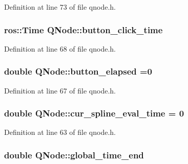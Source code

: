 Definition at line 73 of file qnode.\+h.

\subsubsection[{\texorpdfstring{button\+\_\+click\+\_\+time}{button_click_time}}]{\setlength{\rightskip}{0pt plus 5cm}ros\+::\+Time Q\+Node\+::button\+\_\+click\+\_\+time}\hypertarget{class_q_node_a96e6599c14732ded065ae6a5b004f872}{}\label{class_q_node_a96e6599c14732ded065ae6a5b004f872}


Definition at line 68 of file qnode.\+h.

\subsubsection[{\texorpdfstring{button\+\_\+elapsed}{button_elapsed}}]{\setlength{\rightskip}{0pt plus 5cm}double Q\+Node\+::button\+\_\+elapsed =0}\hypertarget{class_q_node_a2893bbeba854c1cc89d2271804325b7b}{}\label{class_q_node_a2893bbeba854c1cc89d2271804325b7b}


Definition at line 67 of file qnode.\+h.

\subsubsection[{\texorpdfstring{cur\+\_\+spline\+\_\+eval\+\_\+time}{cur_spline_eval_time}}]{\setlength{\rightskip}{0pt plus 5cm}double Q\+Node\+::cur\+\_\+spline\+\_\+eval\+\_\+time = 0}\hypertarget{class_q_node_a45fa5f948c36d96f286d65cee0fef22b}{}\label{class_q_node_a45fa5f948c36d96f286d65cee0fef22b}


Definition at line 63 of file qnode.\+h.

\subsubsection[{\texorpdfstring{global\+\_\+time\+\_\+end}{global_time_end}}]{\setlength{\rightskip}{0pt plus 5cm}double Q\+Node\+::global\+\_\+time\+\_\+end}\hypertarget{class_q_node_a7184edc0e91cf617eb5c3a114858f3ce}{}\label{class_q_node_a7184edc0e91cf617eb5c3a114858f3ce}


